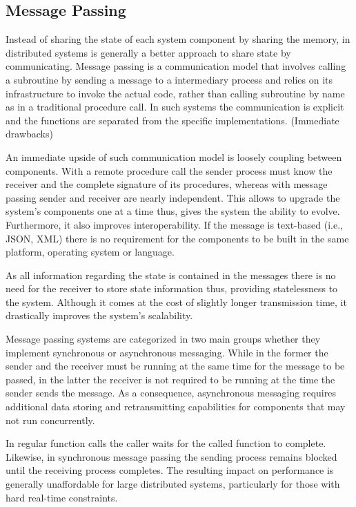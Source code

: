 \subsection{Message Passing} \label{message_passing}

Instead of sharing the state of each system component by sharing the memory, in distributed systems is generally a better approach to share state by communicating. Message passing is a communication model that involves calling a subroutine by sending a message to a intermediary process and relies on its infrastructure to invoke the actual code, rather than calling subroutine by name as in a traditional procedure call. In such systems the communication is explicit and the functions are separated from the specific implementations. (Immediate drawbacks)

An immediate upside of such communication model is loosely coupling between components. With a remote procedure call the sender process must know the receiver and the complete signature of its procedures, whereas with message passing sender and receiver are nearly independent. This allows to upgrade the system's components one at a time thus, gives the system the ability to evolve. Furthermore, it also improves interoperability. If the message is text-based (i.e., JSON, XML) there is no requirement for the components to be built in the same platform, operating system or language.

As all information regarding the state is contained in the messages there is no need for the receiver to store state information thus, providing statelessness to the system. Although it comes at the cost of slightly longer transmission time, it drastically improves the system's scalability.

Message passing systems are categorized in two main groups whether they implement synchronous or asynchronous messaging. While in the former the sender and the receiver must be running at the same time for the message to be passed, in the latter the receiver is not required to be running at the time the sender sends the message. As a consequence, asynchronous messaging requires additional data storing and retransmitting capabilities for components that may not run concurrently.

In regular function calls the caller waits for the called function to complete. Likewise, in synchronous message passing the sending process remains blocked until the receiving process completes. The resulting impact on performance is generally unaffordable for large distributed systems, particularly for those with hard real-time constraints.

